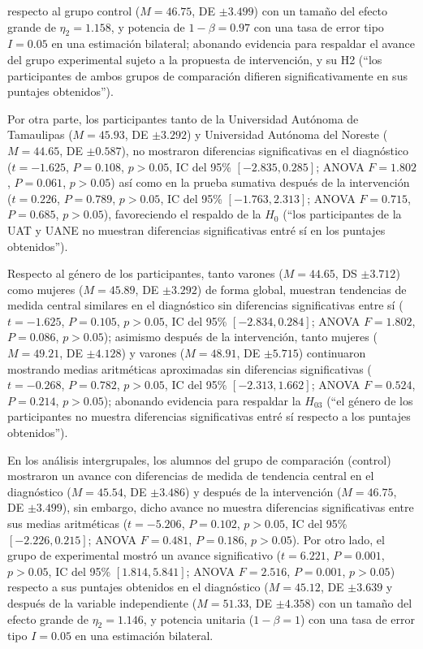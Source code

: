 \documentclass[spanish]{textolivre}
\begin{document}
respecto al grupo control ($M=46.75$, DE $\pm 3.499$) con un tamaño del efecto grande de $\eta_2 = 1.158$, y potencia de $1-\beta = 0.97$ con una tasa de error tipo $I = 0.05$ en una estimación bilateral; abonando evidencia para respaldar el avance del grupo experimental sujeto a la propuesta de intervención, y su H2 (“los participantes de ambos grupos de comparación difieren significativamente en sus puntajes obtenidos”).

Por otra parte, los participantes tanto de la Universidad Autónoma de Tamaulipas ($M=45.93$, DE $\pm 3.292$) y Universidad Autónoma del Noreste ($M=44.65$, DE $\pm 0.587$), no mostraron diferencias significativas en el diagnóstico ($t=-1.625$, $P=0.108$, $p>0.05$, IC del 95\% $[-2.835, 0.285]$; ANOVA $F=1.802$, $P=0.061$, $p>0.05$) así como en la prueba sumativa después de la intervención ($t=0.226$, $P=0.789$, $p>0.05$, IC del 95\% $[-1.763, 2.313]$; ANOVA $F=0.715$, $P=0.685$, $p>0.05$), favoreciendo el respaldo de la $H_0$ (“los participantes de la UAT y UANE no muestran diferencias significativas entré sí en los puntajes obtenidos”).

Respecto al género de los participantes, tanto varones ($M=44.65$, DS $\pm 3.712$) como mujeres ($M=45.89$, DE $\pm 3.292$) de forma global, muestran tendencias de medida central similares en el diagnóstico sin diferencias significativas entre sí ($t=-1.625$, $P=0.105$, $p>0.05$, IC del 95\% $[-2.834, 0.284]$; ANOVA $F=1.802$, $P=0.086$, $p>0.05$); asimismo después de la intervención, tanto mujeres ($M=49.21$, DE $\pm 4.128$) y varones ($M=48.91$, DE $\pm 5.715$) continuaron mostrando medias aritméticas aproximadas sin diferencias significativas ($t=-0.268$, $P=0.782$, $p>0.05$, IC del 95\% $[-2.313, 1.662]$; ANOVA $F=0.524$, $P=0.214$, $p>0.05$); abonando evidencia para respaldar la $H_03$ (“el género de los participantes no muestra diferencias significativas entré sí respecto a los puntajes obtenidos”).

En los análisis intergrupales, los alumnos del grupo de comparación (control) mostraron un avance con diferencias de medida de tendencia central en el diagnóstico ($M=45.54$, DE $\pm 3.486$) y después de la intervención ($M=46.75$, DE $\pm 3.499$), sin embargo, dicho avance no muestra diferencias significativas entre sus medias aritméticas ($t=-5.206$, $P=0.102$, $p>0.05$, IC del 95\% $[-2.226, 0.215]$; ANOVA $F=0.481$, $P=0.186$, $p>0.05$). Por otro lado, el grupo de experimental mostró un avance significativo ($t=6.221$, $P=0.001$, $p>0.05$, IC del 95\% $[1.814, 5.841]$; ANOVA $F=2.516$, $P=0.001$, $p>0.05$) respecto a sus puntajes obtenidos en el diagnóstico ($M=45.12$, DE $\pm 3.639$ y después de la variable independiente ($M=51.33$, DE $\pm 4.358$) con un tamaño del efecto grande de $\eta_2 = 1.146$, y potencia unitaria ($1-\beta = 1$) con una tasa de error tipo $I = 0.05$ en una estimación bilateral.
\end{document}
